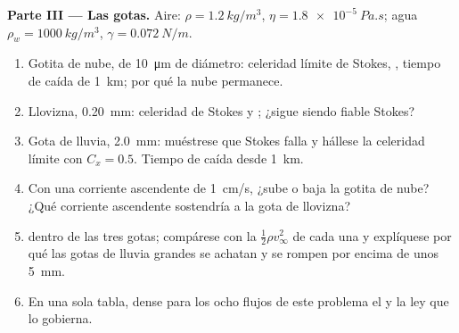 \begin{problem}
\medskip
\noindent\textbf{Parte III --- Las gotas.}
Aire: $\rho = \qty{1.2}{kg/m^3}$, $\eta = \qty{1.8e-5}{Pa.s}$; agua $\rho_w =
\qty{1000}{kg/m^3}$, $\gamma = \qty{0.072}{N/m}$.
\begin{enumerate}[resume]
  \item Gotita de nube, de \qty{10}{\micro m} de diámetro: celeridad límite
        de Stokes, , tiempo de caída de \qty{1}{km}; por
        qué la nube permanece.
  \item Llovizna, \qty{0.20}{mm}: celeridad de Stokes y ;
        ¿sigue siendo fiable Stokes?
  \item Gota de lluvia, \qty{2.0}{mm}: muéstrese que Stokes falla y hállese
        la celeridad límite con $C_x = 0.5$. Tiempo de caída desde
        \qty{1}{km}.
  \item Con una corriente ascendente de \qty{1}{cm/s}, ¿sube o baja la
        gotita de nube? ¿Qué corriente ascendente sostendría a la gota de
        llovizna?
  \item {} dentro de las tres gotas; compárese con la
         $\tfrac12\rho v_\infty^2$ de cada una y explíquese
        por qué las gotas de lluvia grandes se achatan y se rompen por
        encima de unos \qty{5}{mm}.
  \item En una sola tabla, dense para los ocho flujos de este problema el
         y la ley que lo gobierna.
\end{enumerate}
\end{problem}
